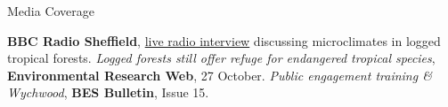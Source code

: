 \begin{rubric}{Media Coverage}

\entry*[2017] \textbf{BBC Radio Sheffield}, \href{https://acce.shef.ac.uk/good-news-for-a-change-acce-student-rebecca-seniors-interview-for-bbc/}{live radio interview} discussing microclimates in logged tropical forests. 
\entry*[2017] \emph{Logged forests still offer refuge for endangered tropical species}, \textbf{Environmental Research Web}, 27 October.
\entry*[2016] \emph{Public engagement training \& Wychwood}, \textbf{BES Bulletin}, Issue 15.
\end{rubric}